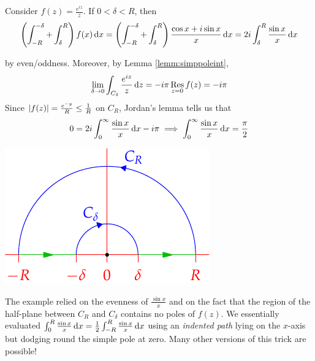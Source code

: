 \begin{example}{}{}
Consider $f(z)=\frac{e^{iz}}z$. If $0<\delta<R$, then
\[\left(\int_{-R}^{-\delta}+\int_\delta^R\right)f(x)\,{\mathrm{d} x}=\left(\int_{-R}^{-\delta}+\int_\delta^R\right)\frac{\cos x+i\sin x}{x}\,{\mathrm{d} x} =2i\int_\delta^R\frac{\sin x}x\,{\mathrm{d} x}\]

\begin{minipage}[t]{0.59\linewidth}\vspace{0pt}
by even/oddness. Moreover, by Lemma \ref{lemm:simppoleint},
\[\lim_{\delta\to 0}\int_{C_\delta}\frac{e^{iz}}z\,{\mathrm{d} z}=-i\pi\operatorname*{Res}_{z=0}f(z)=-i\pi\]
Since $\left| f(z)\right|=\frac{e^{-y}}R\le \frac 1R$ on $C_R$, Jordan's lemma tells us that
\[0=2i\int_0^\infty\frac{\sin x}x\,{\mathrm{d} x}-i\pi\implies \int_0^\infty\frac{\sin x}x\,{\mathrm{d} x}=\frac\pi 2\]
\end{minipage}
\begin{minipage}[t]{0.4\linewidth}\vspace{0pt}
\flushright\includegraphics{integral6}
\end{minipage}
\end{example}

The example relied on the evenness of $\frac{\sin x}x$ and on the fact that the region of the half-plane between $C_R$ and $C_\delta$ contains no poles of $f(z)$. We essentially evaluated $\int_0^R\frac{\sin x}x\,{\mathrm{d} x}=\frac 12\int_{-R}^R\frac{\sin x}x\,{\mathrm{d} x}$ using an \emph{indented path} lying on the $x$-axis but dodging round the simple pole at zero. Many other versions of this trick are possible!


